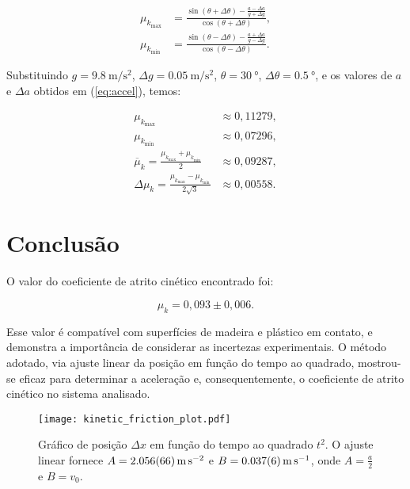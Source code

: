 \documentclass[10pt,oneside,twocolumn,a4paper]{article}
\begin{document}
\begin{align*}
	\mu_{k_\text{max}} &= \frac{\sin(\theta + \Delta\theta) - \frac{a - \Delta a}{g + \Delta g}}{\cos(\theta + \Delta\theta)}, \\
	\mu_{k_\text{min}} &= \frac{\sin(\theta - \Delta\theta) - \frac{a + \Delta a}{g - \Delta g}}{\cos(\theta - \Delta\theta)}.
\end{align*}


Substituindo $g = \SI{9.8}{\meter\per\second\squared}$, $\Delta g =
\SI{0.05}{\meter\per\second\squared}$, $\theta = \SI{30}{\degree}$,
$\Delta\theta = \SI{0.5}{\degree}$, e os valores de $a$ e $\Delta a$ obtidos em
(\ref{eq:accel}), temos:

\begin{align*}
	\mu_{k_\text{max}} &\approx 0,11279, \\
	\mu_{k_\text{min}} &\approx 0,07296, \\
	\overline\mu_k = \frac{\mu_{k_\text{max}} + \mu_{k_\text{min}}}{2} &\approx 0,09287, \\
	\Delta\mu_k = \frac{\mu_{k_\text{max}} - \mu_{k_\text{min}}}{2\sqrt{3}} &\approx 0,00558.
\end{align*}

\section{Conclusão}

O valor do coeficiente de atrito cinético encontrado foi:

\begin{equation*}
	\mu_k = 0,093 \pm 0,006.
\end{equation*}

Esse valor é compatível com superfícies de madeira e plástico em contato, e
demonstra a importância de considerar as incertezas experimentais. O método
adotado, via ajuste linear da posição em função do tempo ao quadrado,
mostrou-se eficaz para determinar a aceleração e, consequentemente, o
coeficiente de atrito cinético no sistema analisado.


\onecolumn

\begin{figure}[p]
		\texttt{[image: kinetic\_friction\_plot.pdf]}
		\caption{
			Gráfico de posição $\Delta x$ em função do tempo ao quadrado $t^2$.
			O ajuste linear fornece $A = \SI{2,056 \pm
			0,066}{\metre\per\second\squared}$ e $B = \SI{0,037 \pm
			0,006}{\metre\per\second}$, onde $A = \frac{a}{2}$ e $B = v_0$.
		}
		\label{fig:kinetic_friction}
\end{figure}
\end{document}
